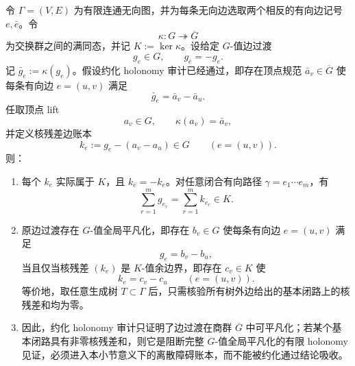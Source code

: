 \begin{proposition}\label{distill:gromov-formal_versus_genuine_realization_families-physical-reduced-kernel-holonomy-audit}
令 \(\Gamma=(V,E)\) 为有限连通无向图，并为每条无向边选取两个相反的有向边记号 \(e,\bar e\)。令
\[
\kappa:G\twoheadrightarrow \overline G
\]
为交换群之间的满同态，并记 \(K:=\ker\kappa\)。设给定 \(G\)-值边过渡
\[
g_e\in G,
\qquad
g_{\bar e}=-g_e.
\]
记 \(\bar g_e:=\kappa(g_e)\)。假设约化 holonomy 审计已经通过，即存在顶点规范 \(\bar a_v\in\overline G\) 使每条有向边 \(e=(u,v)\) 满足
\[
\bar g_e=\bar a_v-\bar a_u.
\]
任取顶点 lift
\[
a_v\in G,
\qquad
\kappa(a_v)=\bar a_v,
\]
并定义核残差边账本
\[
k_e:=g_e-(a_v-a_u)\in G
\qquad(e=(u,v)).
\]
则：
\begin{enumerate}
  \item 每个 \(k_e\) 实际属于 \(K\)，且 \(k_{\bar e}=-k_e\)。对任意闭合有向路径 \(\gamma=e_1\cdots e_m\)，有
  \[
  \sum_{r=1}^m g_{e_r}=\sum_{r=1}^m k_{e_r}\in K.
  \]
  \item 原边过渡存在 \(G\)-值全局平凡化，即存在 \(b_v\in G\) 使每条有向边 \(e=(u,v)\) 满足
  \[
  g_e=b_v-b_u,
  \]
  当且仅当核残差 \((k_e)\) 是 \(K\)-值余边界，即存在 \(c_v\in K\) 使
  \[
  k_e=c_v-c_u\qquad(e=(u,v)).
  \]
  等价地，取任意生成树 \(T\subset\Gamma\) 后，只需核验所有树外边给出的基本闭路上的核残差和均为零。
  \item 因此，约化 holonomy 审计只证明了边过渡在商群 \(\overline G\) 中可平凡化；若某个基本闭路具有非零核残差和，则它是阻断完整 \(G\)-值全局平凡化的有限 holonomy 见证，必须进入本小节意义下的离散障碍账本，而不能被约化通过结论吸收。
\end{enumerate}
\end{proposition}
